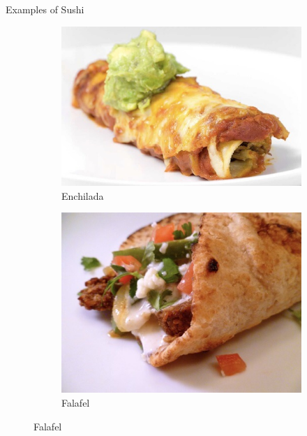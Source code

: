 \documentclass{beamer}
\begin{document}
\begin{frame}{Examples of Sushi}
    \begin{figure}
        \begin{subfigure}{.4\textwidth}
          \centering
          \includegraphics[width=.8\linewidth]{sushi/22_enchilada.jpg}
          \caption{\label{fig:enchilada}Enchilada}
        \end{subfigure}
        \begin{subfigure}{.4\textwidth}
          \centering
          \includegraphics[width=.8\linewidth]{sushi/22_falafel.jpg}
          \caption{\label{fig:falafel}Falafel}
        \end{subfigure}%

\end{figure}
\end{frame}
\end{document}
